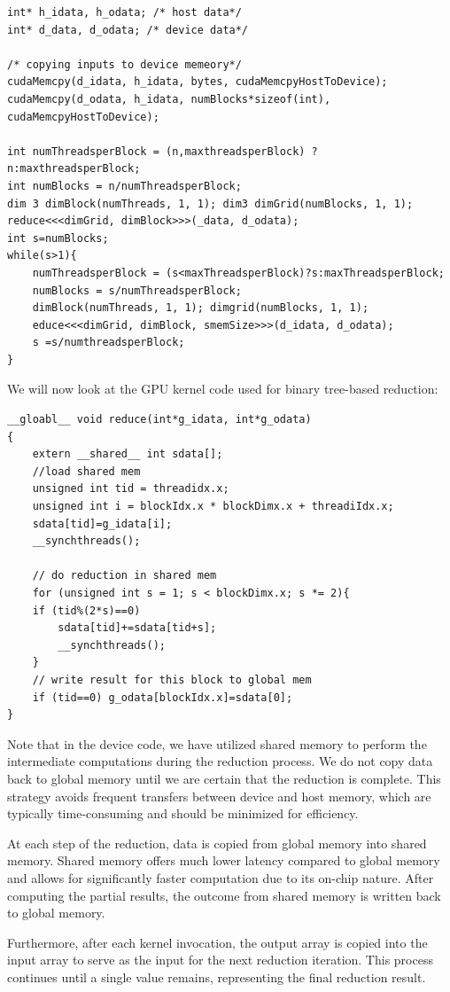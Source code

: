 \documentclass[12pt]{book}
\begin{document}
\begin{lstlisting}[style=cppstyle]
int* h_idata, h_odata; /* host data*/
int* d_data, d_odata; /* device data*/

/* copying inputs to device memeory*/
cudaMemcpy(d_idata, h_idata, bytes, cudaMemcpyHostToDevice);
cudaMemcpy(d_odata, h_idata, numBlocks*sizeof(int), cudaMemcpyHostToDevice);

int numThreadsperBlock = (n,maxthreadsperBlock) ? n:maxthreadsperBlock;
int numBlocks = n/numThreadsperBlock;
dim 3 dimBlock(numThreads, 1, 1); dim3 dimGrid(numBlocks, 1, 1);
reduce<<<dimGrid, dimBlock>>>(_data, d_odata);
int s=numBlocks;
while(s>1){
    numThreadsperBlock = (s<maxThreadsperBlock)?s:maxThreadsperBlock;
    numBlocks = s/numThreadsperBlock;
    dimBlock(numThreads, 1, 1); dimgrid(numBlocks, 1, 1);
    educe<<<dimGrid, dimBlock, smemSize>>>(d_idata, d_odata);
    s =s/numthreadsperBlock;
}
\end{lstlisting}
We will now look at the GPU kernel code used for binary tree-based reduction:
\begin{lstlisting}[style=cppstyle]
__gloabl__ void reduce(int*g_idata, int*g_odata)
{
    extern __shared__ int sdata[];
    //load shared mem
    unsigned int tid = threadidx.x;
    unsigned int i = blockIdx.x * blockDimx.x + threadiIdx.x;
    sdata[tid]=g_idata[i];
    __synchthreads();

    // do reduction in shared mem
    for (unsigned int s = 1; s < blockDimx.x; s *= 2){
    if (tid%(2*s)==0)
        sdata[tid]+=sdata[tid+s];
        __synchthreads();
    }
    // write result for this block to global mem
    if (tid==0) g_odata[blockIdx.x]=sdata[0];
}
\end{lstlisting}
Note that in the device code, we have utilized shared memory to perform the intermediate computations during the reduction process. We do not copy data back to global memory until we are certain that the reduction is complete. This strategy avoids frequent transfers between device and host memory, which are typically time-consuming and should be minimized for efficiency. 

At each step of the reduction, data is copied from global memory into shared memory. Shared memory offers much lower latency compared to global memory and allows for significantly faster computation due to its on-chip nature. After computing the partial results, the outcome from shared memory is written back to global memory.

Furthermore, after each kernel invocation, the output array is copied into the input array to serve as the input for the next reduction iteration. This process continues until a single value remains, representing the final reduction result.
\end{document}

